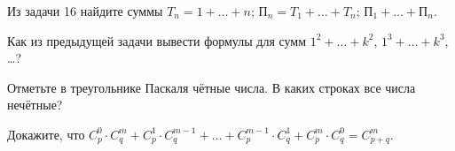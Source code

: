 \documentclass[12pt,a4paper]{article}
\begin{document}
Из задачи 16 найдите суммы
$T_n=1+\ldots+n$;
 $П_n=T_1+\ldots+T_n$;
 $П_1+\ldots+П_n$.

Как из предыдущей задачи вывести формулы для сумм  $1^2+\ldots+k^2$,
$1^3+\ldots+k^3$, \ldots?

Отметьте в треугольнике Паскаля чётные числа.
В каких строках %
все числа нечётные?

Докажите, что
$C_p^0\cdot C_q^m+C_p^1\cdot C_q^{m-1}+\ldots+C_p^{m-1}\cdot C_q^1
+C_p^m\cdot C_q^0=C_{p+q}^m$.


\end{document}
